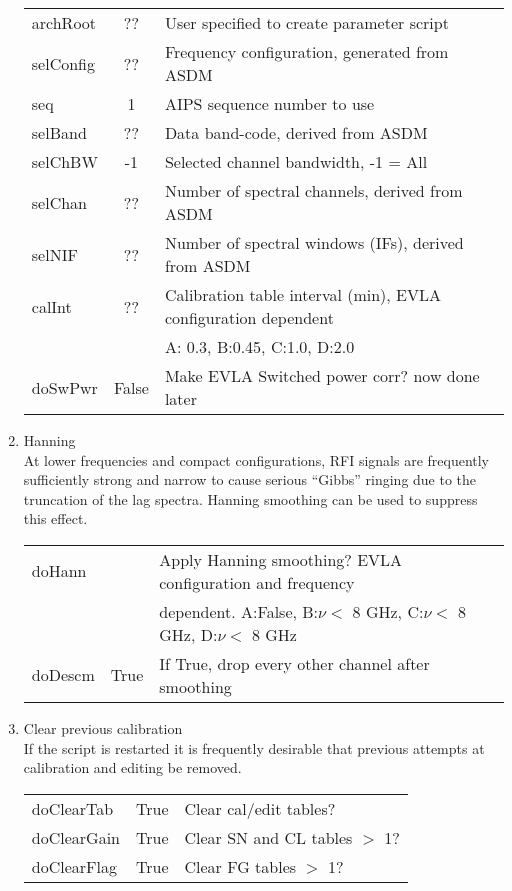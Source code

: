 \documentclass[11pt]{article}
\begin{document}
\begin{enumerate}
\begin{center}
\begin{tabular}{|l|c|l|}
archRoot  & ?? &  User specified to create parameter script\\
selConfig  & ?? &  Frequency configuration, generated from ASDM\\
seq     & 1   &  AIPS sequence number to use \\
selBand & ??  &  Data band-code, derived from ASDM\\
selChBW & -1  &  Selected channel bandwidth, -1 = All\\
selChan & ??  &  Number of spectral channels, derived from ASDM\\
selNIF  & ??  &  Number of spectral windows (IFs), derived from ASDM\\
calInt  & ??  &  Calibration table interval (min), EVLA configuration
dependent\\
  &  & A: 0.3, B:0.45, C:1.0, D:2.0\\
doSwPwr & False & Make EVLA Switched power corr? now done later\\
\hline
\end{tabular}
\end{center}
%
\item Hanning \\
At lower frequencies and compact configurations, RFI signals are
frequently sufficiently strong and narrow to cause serious ``Gibbs''
ringing due to the truncation of the lag spectra.
Hanning smoothing can be used to suppress this effect.
\begin{center}
\begin{tabular}{|l|c|l|}
\hline
doHann  &  &  Apply Hanning smoothing? EVLA configuration
 and frequency \\
  &  & dependent. A:False, B:$\nu<$ 8 GHz, C:$\nu<$ 8 GHz, D:$\nu<$ 8 GHz\\
doDescm  & True  & If True, drop every other channel after smoothing  \\
\hline
\end{tabular}
\end{center}
%
\item Clear previous calibration\\
If the script is restarted it is frequently desirable that previous
attempts at calibration and editing be removed.
\begin{center}
\begin{tabular}{|l|c|l|}
\hline
doClearTab   & True & Clear cal/edit tables? \\
doClearGain  & True & Clear SN and CL tables $>$ 1? \\
doClearFlag  & True & Clear FG tables $>$ 1? \\

\end{tabular}
\end{center}
\end{enumerate}
\end{document}
